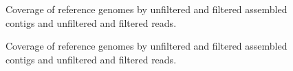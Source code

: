 \documentclass[11pt]{article} %
\begin{document}
\begin{figure}[ht]
\caption{Coverage of reference genomes by unfiltered and filtered
  assembled contigs and unfiltered and filtered reads.}
\label{coverage1}
\end{figure}

\begin{figure}[ht]
\caption{Coverage of reference genomes by unfiltered and filtered
  assembled contigs and unfiltered and filtered reads.}
\label{coverage2}
\end{figure}
\end{document}

